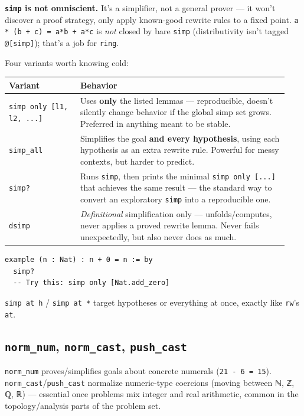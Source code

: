 \textbf{\texttt{simp} is not omniscient.} It's a simplifier, not a general prover --- it won't discover a proof strategy, only apply known-good rewrite rules to a fixed point. \texttt{a * (b + c) = a*b + a*c} is \emph{not} closed by bare \texttt{simp} (distributivity isn't tagged \texttt{@[simp]}); that's a job for \texttt{ring}.

Four variants worth knowing cold:

\begin{center}
\begin{tabular}{@{}p{0.24\linewidth}p{0.70\linewidth}@{}}
\hline
\textbf{Variant} & \textbf{Behavior} \\
\hline
\texttt{simp only [l1, l2, ...]} & Uses \textbf{only} the listed lemmas --- reproducible, doesn't silently change behavior if the global simp set grows. Preferred in anything meant to be stable. \\
\texttt{simp\_all} & Simplifies the goal \textbf{and every hypothesis}, using each hypothesis as an extra rewrite rule. Powerful for messy contexts, but harder to predict. \\
\texttt{simp?} & Runs \texttt{simp}, then prints the minimal \texttt{simp only [...]} that achieves the same result --- the standard way to convert an exploratory \texttt{simp} into a reproducible one. \\
\texttt{dsimp} & \emph{Definitional} simplification only --- unfolds/computes, never applies a proved rewrite lemma. Never fails unexpectedly, but also never does as much. \\
\hline
\end{tabular}
\end{center}

\begin{verbatim}
example (n : Nat) : n + 0 = n := by
  simp?
  -- Try this: simp only [Nat.add_zero]
\end{verbatim}

\texttt{simp at h} / \texttt{simp at *} target hypotheses or everything at once, exactly like \texttt{rw}'s \texttt{at}.

\subsection{\texttt{norm\_num}, \texttt{norm\_cast}, \texttt{push\_cast}}

\texttt{norm\_num} proves/simplifies goals about concrete numerals (\texttt{21 - 6 = 15}). \texttt{norm\_cast}/\texttt{push\_cast} normalize numeric-type coercions (moving between ℕ, ℤ, ℚ, ℝ) --- essential once problems mix integer and real arithmetic, common in the topology/analysis parts of the problem set.

